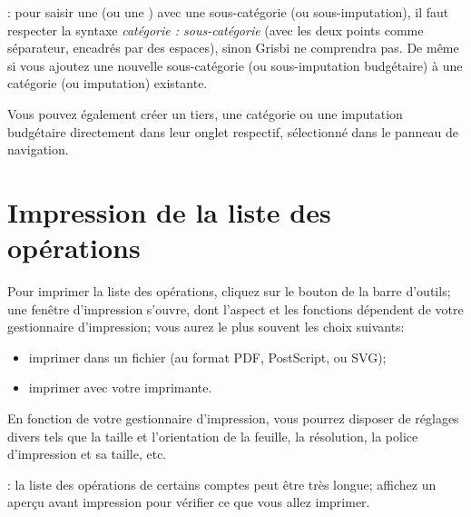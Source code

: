 \Note{}: pour saisir une  (ou une ) avec une sous-catégorie (ou sous-imputation), il faut respecter la syntaxe \emph{catégorie : sous-catégorie} (avec les deux points comme séparateur, encadrés par des espaces), sinon Grisbi ne comprendra pas. De même si vous ajoutez une nouvelle sous-catégorie (ou sous-imputation budgétaire) à une catégorie (ou imputation) existante.

Vous pouvez également créer un tiers, une catégorie ou une imputation budgétaire directement dans leur onglet respectif, sélectionné dans le panneau de navigation.


\section{Impression de la liste des opérations\label{transactions-print}}
Pour imprimer la liste des opérations, cliquez sur le bouton  de la barre d'outils; une fenêtre d'impression s'ouvre, dont l'aspect et les fonctions dépendent de votre gestionnaire d'impression; vous aurez le plus souvent les choix suivants:

\begin{itemize}
	\item imprimer dans un fichier (au format \gls{PDF}, \gls{PostScript}, ou \gls{SVG});
	\item imprimer avec votre imprimante.
\end{itemize}

En fonction de votre gestionnaire d'impression, vous pourrez disposer de réglages divers tels que la taille et l'orientation de la feuille, la résolution, la police d'impression et sa taille, etc.

\Note{}: la liste des opérations de certains comptes peut être très longue; affichez un aperçu avant impression pour vérifier ce que vous allez imprimer.



